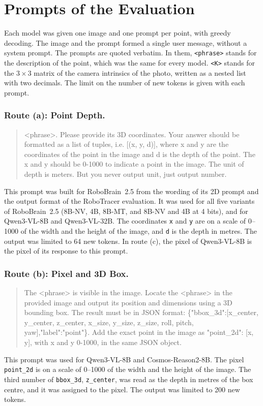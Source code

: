 \section{Prompts of the Evaluation}\label{app:prompts}
Each model was given one image and one prompt per point, with greedy decoding.
The image and the prompt formed a single user message, without a system prompt.
The prompts are quoted verbatim.
In them, \texttt{<phrase>} stands for the description of the point, which was the same for every model.
\texttt{<K>} stands for the $3 \times 3$ matrix of the camera intrinsics of the photo, written as a nested list with two decimals.
The limit on the number of new tokens is given with each prompt.

\subsubsection{Route (a): Point Depth.}
\begin{quote}\small\ttfamily\raggedright
<phrase>. Please provide its 3D coordinates. Your answer should be formatted as a list of tuples, i.e. [(x, y, d)], where x and y are the coordinates of the point in the image and d is the depth of the point. The x and y should be 0-1000 to indicate a point in the image. The unit of depth is meters. But you never output unit, just output number.
\end{quote}
This prompt was built for RoboBrain~2.5 from the wording of its 2D prompt and the output format of the RoboTracer evaluation.
It was used for all five variants of RoboBrain~2.5 (8B-NV, 4B, 8B-MT, and 8B-NV and 4B at 4 bits), and for Qwen3-VL-8B and Qwen3-VL-32B.
The coordinates \texttt{x} and \texttt{y} are on a scale of 0--1000 of the width and the height of the image, and \texttt{d} is the depth in metres.
The output was limited to 64 new tokens.
In route (c), the pixel of Qwen3-VL-8B is the pixel of its response to this prompt.

\subsubsection{Route (b): Pixel and 3D Box.}
\begin{quote}\small\ttfamily\raggedright
The <phrase> is visible in the image. Locate the <phrase> in the provided image and output its position and dimensions using a 3D bounding box. The result must be in JSON format: \{"bbox\_3d":[x\_center, y\_center, z\_center, x\_size, y\_size, z\_size, roll, pitch, yaw],\allowbreak{}"label":"point"\}. Add the exact point in the image as "point\_2d": [x, y], with x and y 0-1000, in the same JSON object.
\end{quote}
This prompt was used for Qwen3-VL-8B and Cosmos-Reason2-8B.
The pixel \texttt{point\_2d} is on a scale of 0--1000 of the width and the height of the image.
The third number of \texttt{bbox\_3d}, \texttt{z\_center}, was read as the depth in metres of the box centre, and it was assigned to the pixel.
The output was limited to 200 new tokens.

